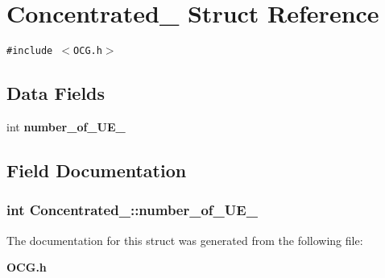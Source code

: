 \section{Concentrated\_\- Struct Reference}
\label{structConcentrated__}
{\tt \#include $<$OCG.h$>$}

\subsection*{Data Fields}
\begin{CompactItemize}
\item 
int {\bf number\_\-of\_\-UE\_\-}
\end{CompactItemize}


\subsection{Field Documentation}
\subsubsection[{number\_\-of\_\-UE\_\-}]{\setlength{\rightskip}{0pt plus 5cm}int {\bf Concentrated\_\-::number\_\-of\_\-UE\_\-}}\label{structConcentrated___5ff5d1d1e89a43544e5a8aa0ec3107ab}




The documentation for this struct was generated from the following file:\begin{CompactItemize}
\item 
{\bf OCG.h}\end{CompactItemize}
